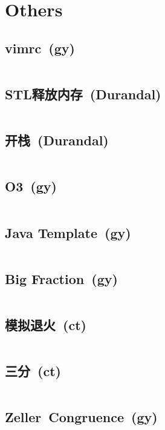 \chapter{Others}
\section{vimrc\ \small(gy)}
	\inputminted{vim}{Others/.vimrc}
\section{STL释放内存\ \small(Durandal)}
	\inputminted{cpp}{Others/stl_clear.cpp}
\section{开栈\ \small(Durandal)}
	\inputminted{cpp}{Others/rsp.cpp}
\section{O3\ \small(gy)}
	\inputminted{cpp}{Others/o3.cpp}
\section{Java Template\ \small(gy)}
	\inputminted{java}{Others/Template.java}
\section{Big Fraction\ \small(gy)}
	\inputminted{kotlin}{Others/big_fraction.kt}
\section{模拟退火\ \small(ct)}
	\inputminted{cpp}{Others/simulated_annealing.cpp}
\section{三分\ \small(ct)}
	\inputminted{cpp}{Others/cubic_search.cpp}
\section{Zeller\ Congruence\ \small(gy)}
	\inputminted{cpp}{Others/zeller_congruence.cpp}

